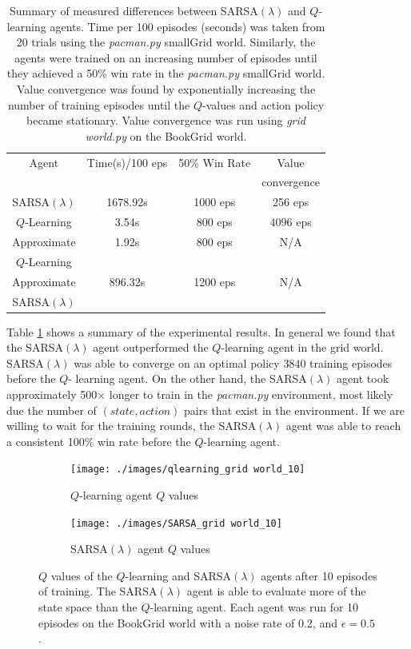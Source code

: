 \documentclass[10pt,conference]{IEEEtran}
\begin{document}
	\begin{table}
		\begin{tabular}{|c|c|c|c|}
			\hline
			Agent & Time(s)/100 eps & 50\% Win Rate & Value \\
			& & & convergence \\
			\hline \hline
			SARSA\((\lambda)\) & 1678.92s & 1000 eps & 256 eps \\
			\hline
			\(Q\)-Learning & 3.54s & 800 eps & 4096 eps \\
			\hline
			Approximate & 1.92s & 800 eps & N/A \\
			\(Q\)-Learning & & & \\
			\hline
			Approximate & 896.32s & 1200 eps & N/A \\
			SARSA\((\lambda)\) & & & \\
			\hline
		\end{tabular}
		\caption{Summary of measured differences between SARSA\((\lambda)\)
		and \(Q\)-learning agents.  Time per 100 episodes (seconds) was 
		taken from 20 trials using the \textit{pacman.py} smallGrid world.  
		Similarly, the agents were trained on an increasing number of episodes until 
		they achieved a 50\% win rate in the \textit{pacman.py} smallGrid 
		world.  Value convergence was found by exponentially increasing 
		the number of training episodes until the \(Q\)-values and 
		action policy became stationary.  Value convergence was run
		using \textit{grid world.py} on the BookGrid world.}
		\label{summary}
	\end{table}
			
	Table \ref{summary} shows a summary of the experimental results.  In 
	general we found that the SARSA\((\lambda)\) agent outperformed the 
	\(Q\)-learning agent in the grid world.  SARSA\((\lambda)\) was able to 
	converge on an optimal policy 3840 training episodes before the \(Q\)-
	learning agent.  On the other hand, the SARSA\((\lambda)\) agent took approximately
	500\(\times\) longer to train in the \textit{pacman.py} environment, most 
	likely due the number of \((state, action)\) pairs that exist in the 
	environment.  If we are willing to wait for the training rounds, the 
	SARSA\((\lambda)\) agent was able to reach a consistent 100\% win rate before
	the \(Q\)-learning agent. 

	\begin{figure}[h]
		\centering
		\begin{subfigure}[b]{0.25\textwidth}
			\texttt{[image: ./images/qlearning\_grid world\_10]}
			\caption{\(Q\)-learning agent \(Q\) values}
		\end{subfigure}%
		\begin{subfigure}[b]{0.25\textwidth}
			\texttt{[image: ./images/SARSA\_grid world\_10]}
			\caption{SARSA\((\lambda)\) agent \(Q\) values}
		\end{subfigure}
		\caption{\(Q\) values of the \(Q\)-learning and SARSA\((\lambda)\) agents 
		after 10 episodes of training.  The SARSA\((\lambda)\) agent is able
		to evaluate more of the state space than the \(Q\)-learning agent.
		Each agent was run for 10 episodes on the BookGrid world with a noise
		rate of 0.2, and \(\epsilon = 0.5\).}
		\label{qvalues}
	\end{figure}
\end{document}
